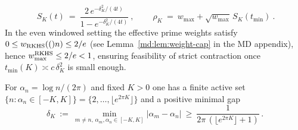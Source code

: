 \begin{remark}
\begin{equation}\label{eq:RKHS_contraction-formula-5}
 \boxed{\ S_K(t)\ =\ \frac{2\,e^{-\delta_K^2/(4t)}}{1-e^{-\delta_K^2/(4t)}}\ },\qquad \boxed{\ \rho_K\ =\ w_{\max}+\sqrt{w_{\max}}\,S_K(t_{\min})\ }.
\end{equation}
In the even windowed setting the effective prime weights satisfy $0\le w_{\mathrm{RKHS}}(()n)\le 2/e$ (see Lemma~\ref{md:lem:weight-cap} in the MD appendix), hence $w_{\max}^{\mathrm{RKHS}}\le 2/e<1$, ensuring feasibility of strict contraction once $t_{\min}(K)\asymp c\,\delta_K^2$ is small enough.
\end{remark}

\begin{lemma}\label{rkhs:lem:deltaK}
For $\alpha_n=\log n/(2\pi)$ and fixed $K>0$ one has a finite active set $\{n: \alpha_n\in[-K,K]\}=\{2,\dots,\lfloor e^{2\pi K}\rfloor\}$ and a positive minimal gap
\begin{equation}\label{eq:RKHS_contraction-formula}
 \delta_K\ :=\ \min_{m\ne n,\,\alpha_m,\alpha_n\in[-K,K]} |\alpha_m-\alpha_n|\ \ge\ \frac{1}{2\pi\,(\lfloor e^{2\pi K}\rfloor+1)}\,.
\end{equation}
\end{lemma}
